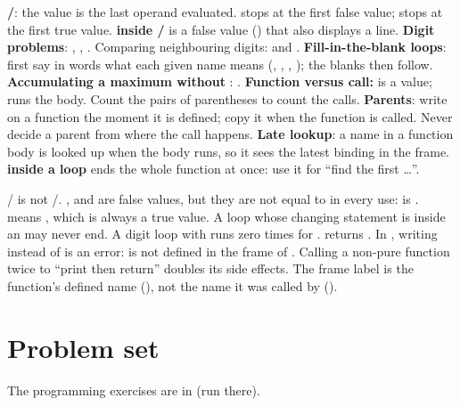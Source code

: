 \documentclass[10pt]{scrartcl}
\begin{document}
\begin{shortcuts}
  \ii \textbf{/}: the value is the last operand evaluated.  stops at the first false value;  stops at the first true value.
  \ii \textbf{ inside /} is a false value () that also displays a line.
  \ii \textbf{Digit problems}: , , . Comparing neighbouring digits:  and .
  \ii \textbf{Fill-in-the-blank loops}: first say in words what each given name means (, , , ); the blanks then follow.
  \ii \textbf{Accumulating a maximum without }: .
  \ii \textbf{Function versus call:}  is a value;  runs the body. Count the pairs of parentheses to count the calls.
  \ii \textbf{Parents}: write \cd{[parent=...]} on a function the moment it is defined; copy it when the function is called. Never decide a parent from where the call happens.
  \ii \textbf{Late lookup}: a name in a function body is looked up when the body runs, so it sees the latest binding in the frame.
  \ii \textbf{ inside a loop} ends the whole function at once: use it for ``find the first \dots''.
\end{shortcuts}
\begin{trapbox}
  \ii {}/ is not /.
  \ii {},  and  are false values, but they are not equal to  in every use:  is .
  \ii {} means , which is always a true value.
  \ii A  loop whose changing statement is inside an  may never end.
  \ii A digit loop with  runs zero times for .
  \ii {} returns .
  \ii In , writing  instead of  is an error:  is not defined in the frame of .
  \ii Calling a non-pure function twice to ``print then return'' doubles its side effects.
  \ii The frame label is the function's defined name (), not the name it was called by ().
\end{trapbox}

\section{Problem set}
The programming exercises are in  (run  there).
\end{document}

